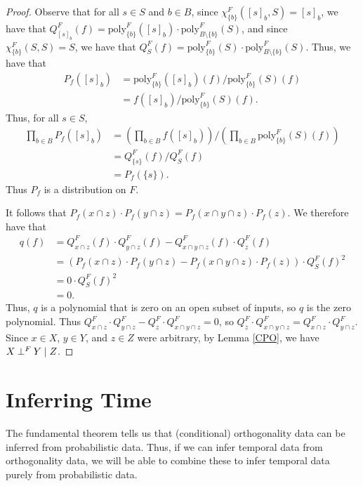 \documentclass[authordate,onecolumn]{miri-tech-article}
\begin{document}
\begin{proof}
Observe that for all $s\in S$ and $b\in B$, since $\chi^F_{\{b\}}([s]_b,S)=[s]_b$, we have that $Q^F_{[s]_b}(f)=\text{poly}_{\{b\}}^F([s]_b)\cdot\text{poly}_{B\setminus\{b\}}^F(S)$, and since $\chi^F_{\{b\}}(S,S)=S$, we have that $Q^F_{S}(f)=\text{poly}_{\{b\}}^F(S)\cdot\text{poly}_{B\setminus\{b\}}^F(S)$. Thus, we have that
\begin{equation}
\begin{split}
P_f([s]_b)
& = \text{poly}_{\{b\}}^F([s]_b)(f)/\text{poly}_{\{b\}}^F(S)(f)\\
 & = f([s]_b)/\text{poly}_{\{b\}}^F(S)(f).
\end{split}
\end{equation}
Thus, for all $s\in S$,
\begin{equation}
\begin{split}
\prod_{b\in B}P_f([s]_b)
& = (\prod_{b\in B}f([s]_b))/(\prod_{b\in B}\text{poly}_{\{b\}}^F(S)(f))\\[4pt]
 & = Q^F_{\{s\}}(f)/Q^F_S(f)\\[4pt]
 & = P_f(\{s\}).
\end{split}
\end{equation}
Thus $P_f$ is a distribution on $F$.

It follows that $P_f(x\cap z)\cdot P_f(y\cap z)= P_f(x\cap y\cap z)\cdot P_f(z)$. We therefore have that
\begin{equation}
\begin{split}
q(f) & = Q^F_{x\cap z}(f)\cdot Q^F_{y\cap z}(f)-Q^F_{x\cap y\cap z}(f)\cdot Q^F_{z}(f)\\
 & = (P_f(x\cap z)\cdot P_f(y\cap z)-P_f(x\cap y\cap z)\cdot P_f(z))\cdot Q^F_{S}(f)^2\\
  & = 0\cdot Q^F_{S}(f)^2\\
    & = 0.
\end{split}
\end{equation}
Thus, $q$ is a polynomial that is zero on an open subset of inputs, so $q$ is the zero polynomial. Thus $Q^F_{x\cap z} \cdot Q^F_{y\cap z}-Q^F_{z} \cdot Q^F_{x\cap y\cap z}=0$, so $Q^F_{z} \cdot Q^F_{x\cap y\cap z}=Q^F_{x\cap z} \cdot Q^F_{y\cap z}$. Since $x\in X$, $y\in Y$, and $z\in Z$ were arbitrary, by Lemma \ref{CPO}, we have $X\mathbin{\perp^{F}}Y\mid Z$.
\end{proof}
\section{Inferring Time}\label{inftime}
The fundamental theorem tells us that (conditional) orthogonality data can be inferred from probabilistic data. Thus, if we can infer temporal data from orthogonality data, we will be able to combine these to infer temporal data purely from probabilistic data.
\end{document}
